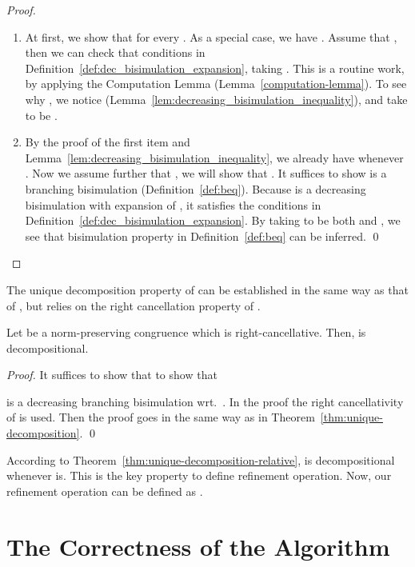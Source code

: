 \documentclass{llncs}
\begin{document}
\begin{proof}
\begin{enumerate}
\item
At first, we show that  for every . As a special case, we have . Assume that , then we can check that conditions in Definition~\ref{def:dec_bisimulation_expansion}, taking . This is a routine work, by applying the Computation Lemma (Lemma~\ref{computation-lemma}).
To see  why , we notice  (Lemma~\ref{lem:decreasing_bisimulation_inequality}), and take  to be .

\item
By the proof of the first item and Lemma~\ref{lem:decreasing_bisimulation_inequality}, we already have  whenever . Now we assume further that , we will show that . It suffices to show  is a branching bisimulation (Definition~\ref{def:beq}).  Because  is a decreasing bisimulation with expansion of , it satisfies the conditions in Definition~\ref{def:dec_bisimulation_expansion}. By taking  to be both  and , we see that bisimulation property in Definition~\ref{def:beq} can be inferred.  \qed
\end{enumerate}
\end{proof}


The unique decomposition property of  can be established in the same way as that of , but relies on the right cancellation property of .


\begin{theorem}\label{thm:unique-decomposition-relative}
Let  be a norm-preserving congruence which is right-cancellative. Then,
 is decompositional.
\end{theorem}

\begin{proof}
It suffices to show that to show  that

is a decreasing branching bisimulation wrt.~.
In the proof the right cancellativity of  is used.  Then the proof goes in the same way as in Theorem~\ref{thm:unique-decomposition}.  \qed
\end{proof}

According to Theorem~\ref{thm:unique-decomposition-relative},  is decompositional whenever  is.  This is the key property to define refinement operation. Now, our refinement operation  can be defined as .


\section{The Correctness of the Algorithm}\label{sec:correctness}
\end{document}
